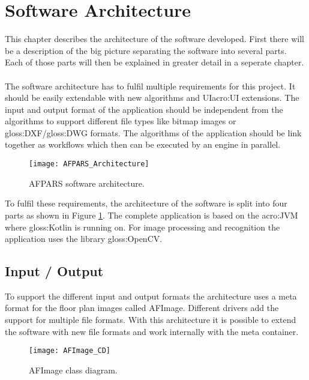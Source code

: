 \section{Software Architecture}
This chapter describes the architecture of the software developed. First there will be a description of the big picture separating the software into several parts. Each of those parts will then be explained in greater detail in a seperate chapter.
\\\\
The software architecture has to fulfil multiple requirements for this project. It should be easily extendable with new algorithms and UI\acrshort{acro:UI} extensions. The input and output format of the application should be independent from the algorithms to support different file types like bitmap images or \gls{gloss:DXF}/\gls{gloss:DWG} formats. The algorithms of the application should be link together as workflows which then can be executed by an engine in parallel.

\begin{figure}[h]
  \centering
      \texttt{[image: AFPARS\_Architecture]}
  \caption{AFPARS software architecture.}
  \label{fig:AFPARS_Architecture}
\end{figure}


To fulfil these requirements, the architecture of the software is split into four parts as shown in Figure \ref{fig:AFPARS_Architecture}. The complete application is based on the \acrfull{acro:JVM} where \gls{gloss:Kotlin} is running on. For image processing and recognition the application uses the library \gls{gloss:OpenCV}.


\pagebreak

\subsection{Input / Output}
To support the different input and output formats the architecture uses a meta format for the
floor plan images called AFImage. Different drivers add the support for multiple file formats. With this architecture it is possible to extend the software with new file formats and work internally with the meta container.

\begin{figure}[h]
  \centering
      \texttt{[image: AFImage\_CD]}
  \caption{AFImage class diagram.}
  \label{fig:AFImage_CD}
\end{figure}


